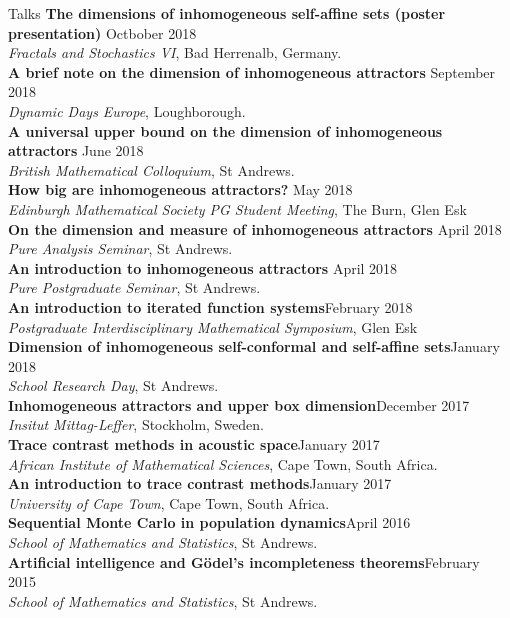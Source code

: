 \documentclass{resume} %
\begin{document}
\begin{rSection}{Talks}
\textbf{The dimensions of inhomogeneous self-affine sets (poster presentation)} \hfill Octbober 2018 \\ \emph{Fractals and Stochastics VI}, Bad Herrenalb, Germany.\\
\textbf{A brief note on the dimension of inhomogeneous attractors} \hfill September 2018 \\\emph{Dynamic Days Europe}, Loughborough.\\
\textbf{A universal upper bound on the dimension of inhomogeneous attractors} \hfill June 2018 \\\emph{British Mathematical Colloquium}, St Andrews.\\
\textbf{How big are inhomogeneous attractors?} \hfill May 2018 \\\emph{Edinburgh Mathematical Society PG Student Meeting}, The Burn, Glen Esk\\
\textbf{On the dimension and measure of inhomogeneous attractors} \hfill April 2018 \\\emph{Pure Analysis Seminar}, St Andrews.\\
\textbf{An introduction to inhomogeneous attractors}  \hfill April 2018\\ \emph{Pure Postgraduate Seminar}, St Andrews.\\
\textbf{An introduction to iterated function systems}\hfill February 2018 \\ \emph{Postgraduate Interdisciplinary Mathematical Symposium}, Glen Esk  \\
\textbf{Dimension of inhomogeneous self-conformal and self-affine sets}\hfill January 2018\\ \emph{School Research Day}, St Andrews.  \\
\textbf{Inhomogeneous attractors and upper box dimension}\hfill December 2017\\ \emph{Insitut Mittag-Leffer}, Stockholm, Sweden. \\
\textbf{Trace contrast methods in acoustic space}\hfill January 2017\\ \emph{African Institute of Mathematical Sciences}, Cape Town, South Africa.  \\
\textbf{An introduction to trace contrast methods}\hfill January 2017 \\ \emph{University of Cape Town}, Cape Town, South Africa.\\
\textbf{Sequential Monte Carlo in population dynamics}\hfill April 2016\\ \emph{School of Mathematics and Statistics}, St Andrews. \\
\textbf{Artificial intelligence and G\"odel's incompleteness theorems}\hfill February 2015 \\ \emph{School of Mathematics and Statistics}, St Andrews. \\
\end{rSection}
\end{document}
